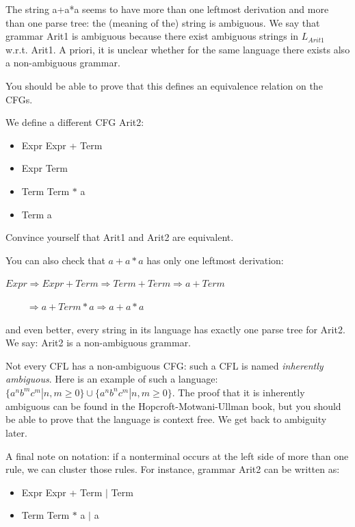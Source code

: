 The string a+a*a seems to have more than one leftmost derivation and
more than one parse tree: the (meaning of the) string is ambiguous.
We say that grammar Arit1 is ambiguous because there exist ambiguous
strings in $L_{Arit1}$ w.r.t. Arit1. A priori, it is unclear whether
for the same language there exists also a non-ambiguous grammar.



You should be able to prove that this defines an equivalence relation
on the CFGs.

We define a different CFG Arit2\label{arit2label}:

\begin{itemize}
\item Expr \rpijl Expr + Term
\item Expr \rpijl Term
\item Term \rpijl Term $*$ a
\item Term \rpijl a
\end{itemize}

Convince yourself that Arit1 and Arit2 are equivalent.

You can also check that $a+a*a$ has only one leftmost derivation:


$Expr \Rightarrow Expr + Term \Rightarrow Term + Term \Rightarrow a + Term$

$~~~~~~~~~~\Rightarrow a + Term * a \Rightarrow a + a * a$


and even better, every string in its language has exactly one parse
tree for Arit2. We say: Arit2 is a non-ambiguous grammar.


Not every CFL has a non-ambiguous CFG: such a CFL is named {\em
  inherently ambiguous}. Here is an example of such a language:
%
 $\{a^nb^mc^m| n,m \geq 0\} \cup \{a^nb^nc^m| n,m \geq 0\}$. The proof that it is
inherently ambiguous can be found in the Hopcroft-Motwani-Ullman book,
but you should be able to prove that the language is context free.
We get back to ambiguity later.

A final note on notation: if a nonterminal occurs at the left side of
more than one rule, we can cluster those rules. For instance, grammar
Arit2 can be written as:
\begin{itemize}
\item Expr \rpijl Expr + Term $|$ Term
\item Term \rpijl Term $*$ a $|$ a
\end{itemize}



